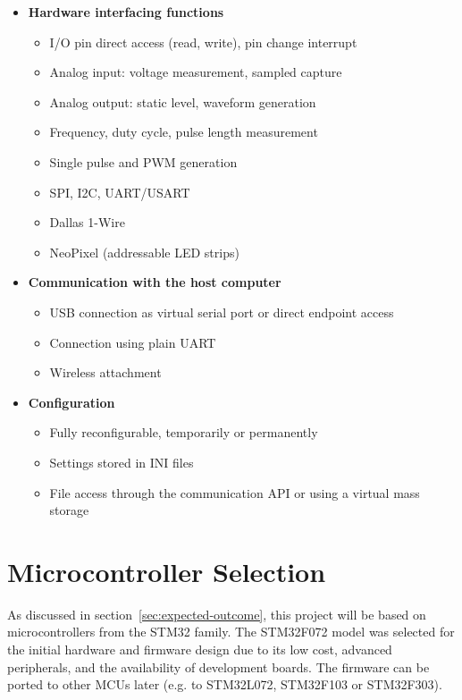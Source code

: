 \begin{itemize}
	\item \textbf{Hardware interfacing functions}
		\begin{itemize}
			\item I/O pin direct access (read, write), pin change interrupt
			\item Analog input: voltage measurement, sampled capture
			\item Analog output: static level, waveform generation
			\item Frequency, duty cycle, pulse length measurement
			\item Single pulse and \gls{PWM} generation
			\item \gls{SPI}, \gls{I2C}, \gls{UART}/\gls{USART}
			\item Dallas 1-Wire
			\item NeoPixel (addressable \gls{LED} strips)
		\end{itemize}
	\pagebreak[0]
	\item \textbf{Communication with the host computer}
		\begin{itemize}
			\item \gls{USB} connection as virtual serial port or direct endpoint access
			\item Connection using plain \gls{UART}
			\item Wireless attachment
		\end{itemize}
	\item \textbf{Configuration}
		\begin{itemize}
			\item Fully reconfigurable, temporarily or permanently
			\item Settings stored in INI files
			\item File access through the communication \gls{API} or using a virtual mass storage
		\end{itemize}
\end{itemize}

\section{Microcontroller Selection}

As discussed in section~\ref{sec:expected-outcome}, this project will be based on microcontrollers from the STM32 family. The STM32F072 model was selected for the initial hardware and firmware design due to its low cost, advanced peripherals, and the availability of development boards. The firmware can be ported to other \glspl{MCU} later (e.g. to STM32L072, STM32F103 or STM32F303).

